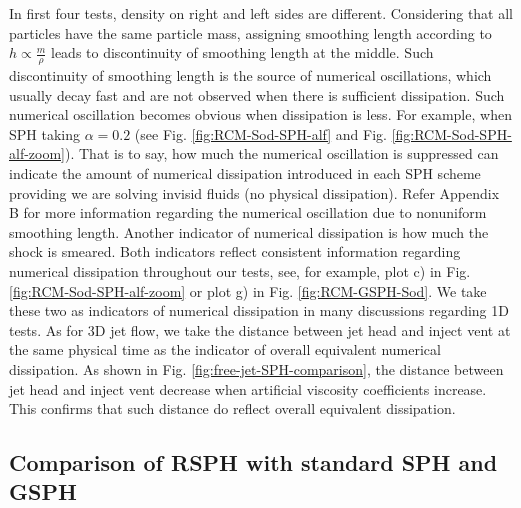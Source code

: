 \documentclass[review]{elsarticle}
\begin{document}
In first four tests, density on right and left sides are different. Considering that all particles have the same particle mass, assigning smoothing length according to $h \propto \frac{m}{\rho}$ leads to discontinuity of smoothing length at the middle. Such discontinuity of smoothing length is the source of numerical oscillations, which usually decay fast and are not observed when there is sufficient dissipation. 
Such  numerical oscillation becomes obvious when dissipation is less. For example, when SPH taking $\alpha=0.2$ (see Fig. \ref{fig:RCM-Sod-SPH-alf} and Fig. \ref{fig:RCM-Sod-SPH-alf-zoom}). That is to say, how much the numerical oscillation is suppressed can indicate the amount of numerical dissipation introduced in each SPH scheme providing we are solving invisid fluids (no physical dissipation). Refer Appendix B for more information regarding the numerical oscillation due to nonuniform smoothing length.
Another indicator of numerical dissipation is how much the shock is smeared. Both indicators reflect consistent information regarding numerical dissipation throughout our tests, see, for example, plot c) in Fig. \ref{fig:RCM-Sod-SPH-alf-zoom} or plot g) in Fig. \ref{fig:RCM-GSPH-Sod}. 
We take these two as indicators of numerical dissipation in many discussions regarding 1D tests.
As for 3D jet flow, we take the distance between jet head and inject vent at the same physical time as the indicator of overall equivalent numerical dissipation. As shown in Fig. \ref{fig:free-jet-SPH-comparison}, the distance between jet head and inject vent decrease when artificial viscosity coefficients increase. This confirms that such distance do reflect overall equivalent dissipation.

\subsection{Comparison of RSPH with standard SPH and GSPH}
\end{document}
